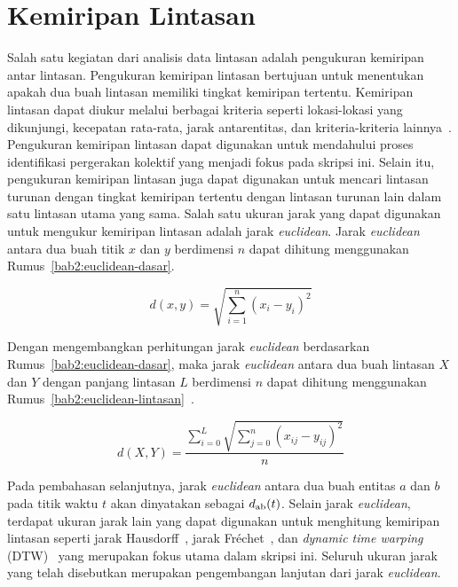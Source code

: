 \section{Kemiripan Lintasan}
\label{sec:kemiripan}

Salah satu kegiatan dari analisis data lintasan adalah pengukuran kemiripan antar lintasan. Pengukuran kemiripan lintasan bertujuan untuk menentukan apakah dua buah lintasan memiliki tingkat kemiripan tertentu. Kemiripan lintasan dapat diukur melalui berbagai kriteria seperti lokasi-lokasi yang dikunjungi, kecepatan rata-rata, jarak antarentitas, dan kriteria-kriteria lainnya~\cite{wiratma:trajectory}. Pengukuran kemiripan lintasan dapat digunakan untuk mendahului proses identifikasi pergerakan kolektif yang menjadi fokus pada skripsi ini. Selain itu, pengukuran kemiripan lintasan juga dapat digunakan untuk mencari lintasan turunan dengan tingkat kemiripan tertentu dengan lintasan turunan lain dalam satu lintasan utama yang sama. Salah satu ukuran jarak yang dapat digunakan untuk mengukur kemiripan lintasan adalah jarak \textit{euclidean}. Jarak \textit{euclidean} antara dua buah titik $x$ dan $y$ berdimensi $n$ dapat dihitung menggunakan Rumus~\ref{bab2:euclidean-dasar}.

\begin{equation}
    d(x, y) = \sqrt{\sum_{i = 1}^{n}(x_i - y_i)^2}
    \label{bab2:euclidean-dasar}
\end{equation}

Dengan mengembangkan perhitungan jarak \textit{euclidean} berdasarkan Rumus~\ref{bab2:euclidean-dasar}, maka jarak \textit{euclidean} antara dua buah lintasan $X$ dan $Y$ dengan panjang lintasan $L$ berdimensi $n$ dapat dihitung menggunakan Rumus~\ref{bab2:euclidean-lintasan}~\cite{su:02:euclidean}.

\begin{equation}
    d(X, Y) = \frac{\sum_{i=0}^{L} \sqrt{\sum_{j=0}^{n}(x_{ij} - y_{ij})^2}}{n}
    \label{bab2:euclidean-lintasan}
\end{equation}

Pada pembahasan selanjutnya, jarak \textit{euclidean} antara dua buah entitas $a$ dan $b$ pada titik waktu $t$ akan dinyatakan sebagai $d\textsubscript{ab}(t)$. Selain jarak \textit{euclidean}, terdapat ukuran jarak lain yang dapat digunakan untuk menghitung kemiripan lintasan seperti jarak Hausdorff~\cite{rote:01:hausdorff}, jarak Fr\'{e}chet~\cite{alt:01:frechet}, dan \textit{dynamic time warping} (DTW)~\cite{muller:dtw} yang merupakan fokus utama dalam skripsi ini. Seluruh ukuran jarak yang telah disebutkan merupakan pengembangan lanjutan dari jarak \textit{euclidean}.

